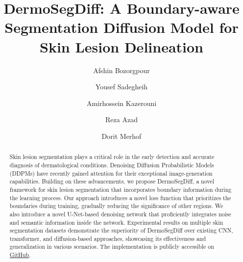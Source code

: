 \documentclass[runningheads]{llncs}
\begin{document}
\title{DermoSegDiff: A Boundary-aware Segmentation Diffusion Model for Skin Lesion Delineation}


\author{Afshin Bozorgpour \and
Yousef Sadegheih \and
Amirhossein Kazerouni \and
Reza Azad  \and
Dorit Merhof }



\maketitle              \begin{abstract}

Skin lesion segmentation plays a critical role in the early detection and accurate diagnosis of dermatological conditions. Denoising Diffusion Probabilistic Models (DDPMs) have recently gained attention for their exceptional image-generation capabilities. Building on these advancements, we propose DermoSegDiff, a novel framework for skin lesion segmentation that incorporates boundary information during the learning process. Our approach introduces a novel loss function that prioritizes the boundaries during training, gradually reducing the significance of other regions. We also introduce a novel U-Net-based denoising network that proficiently integrates noise and semantic information inside the network. Experimental results on multiple skin segmentation datasets demonstrate the superiority of DermoSegDiff over existing CNN, transformer, and diffusion-based approaches, showcasing its effectiveness and generalization in various scenarios. The implementation is publicly accessible on \href{https://github.com/mindflow-institue/dermosegdiff}{GitHub}.

\end{abstract}
\end{document}
